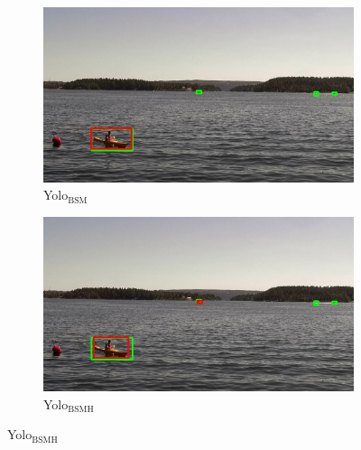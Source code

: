 \begin{figure}[h!]
\begin{subfigure}{.5\textwidth}
  \centering
  \includegraphics[width=0.9\linewidth]{results/case_buildings/yolo23/3better/yolo2/selected_07_05_frame0164.jpg}
  \caption{Yolo$_{\text{BSM}}$}
\end{subfigure}%
\begin{subfigure}{.5\textwidth}
  \centering
  \includegraphics[width=.9\linewidth]{results/case_buildings/yolo23/3better/yolo3/selected_07_05_frame0164.jpg}
  \caption{Yolo$_{\text{BSMH}}$}
\end{subfigure}


\end{figure}
